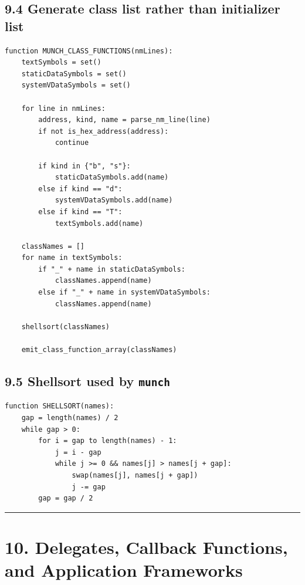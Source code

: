 \documentclass[11pt]{article}
\begin{document}
\subsection{9.4 Generate class list rather than initializer
list}\label{generate-class-list-rather-than-initializer-list}

\begin{verbatim}
function MUNCH_CLASS_FUNCTIONS(nmLines):
    textSymbols = set()
    staticDataSymbols = set()
    systemVDataSymbols = set()

    for line in nmLines:
        address, kind, name = parse_nm_line(line)
        if not is_hex_address(address):
            continue

        if kind in {"b", "s"}:
            staticDataSymbols.add(name)
        else if kind == "d":
            systemVDataSymbols.add(name)
        else if kind == "T":
            textSymbols.add(name)

    classNames = []
    for name in textSymbols:
        if "_" + name in staticDataSymbols:
            classNames.append(name)
        else if "_" + name in systemVDataSymbols:
            classNames.append(name)

    shellsort(classNames)

    emit_class_function_array(classNames)
\end{verbatim}

\subsection{\texorpdfstring{9.5 Shellsort used by
\texttt{munch}}{9.5 Shellsort used by munch}}\label{shellsort-used-by-munch}

\begin{verbatim}
function SHELLSORT(names):
    gap = length(names) / 2
    while gap > 0:
        for i = gap to length(names) - 1:
            j = i - gap
            while j >= 0 && names[j] > names[j + gap]:
                swap(names[j], names[j + gap])
                j -= gap
        gap = gap / 2
\end{verbatim}

\begin{center}\rule{0.5\linewidth}{0.5pt}\end{center}

\section{10. Delegates, Callback Functions, and Application
Frameworks}\label{delegates-callback-functions-and-application-frameworks}
\end{document}
